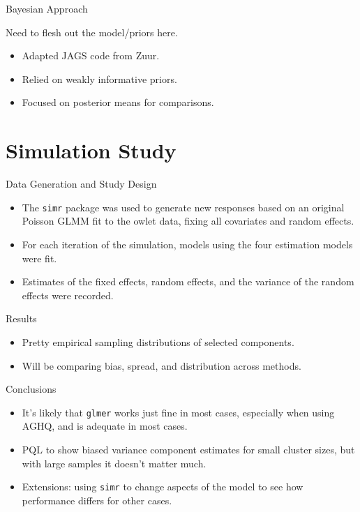 \documentclass{beamer}\usepackage[]{graphicx}\usepackage[]{color}
\begin{document}
\begin{frame}{Bayesian Approach}
	
	Need to flesh out the model/priors here. 
	
	\begin{itemize}
		\item Adapted JAGS code from Zuur.
		\item Relied on weakly informative priors.
		\item Focused on posterior means for comparisons.
	\end{itemize}

\end{frame}

\section{Simulation Study}

\begin{frame}{Data Generation and Study Design}
	
	\begin{itemize}
		\item The {\tt simr} package was used to generate new responses based on an original Poisson GLMM fit to the owlet data, fixing all covariates and random effects.
		\item For each iteration of the simulation, models using the four estimation models were fit. 
		\item Estimates of the fixed effects, random effects, and the variance of the random effects were recorded.
	\end{itemize}

\end{frame}

\begin{frame}{Results}
	
	\begin{itemize}
		\item Pretty empirical sampling distributions of selected components.
		\item Will be comparing bias, spread, and distribution across methods. 
	\end{itemize}

\end{frame}

\begin{frame}{Conclusions}
	
	\begin{itemize}
		\item It's likely that {\tt glmer} works just fine in most cases, especially when using AGHQ, and is adequate in most cases. 
		\item PQL to show biased variance component estimates for small cluster sizes, but with large samples it doesn't matter much. 
		\item Extensions: using {\tt simr} to change aspects of the model to see how performance differs for other cases. 
	\end{itemize}

\end{frame}

\end{document}
